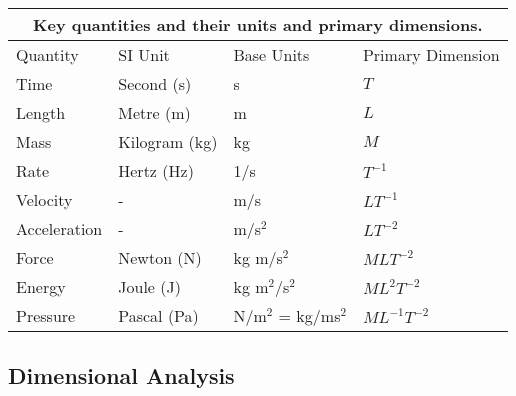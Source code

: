 \documentclass[letterpaper,12pt]{article}
\begin{document}
\begin{table}
\begin{center}
\begin{tabular}{ |p{3cm}||p{4cm}|p{4cm}|p{4cm}|  }
 \hline
 \multicolumn{4}{|c|}{Key quantities and their units and primary dimensions.} \\
 \hline
 Quantity & SI Unit & Base Units & Primary Dimension\\
 \hline
 Time   & Second (s) & s & $T$ \\
 Length & Metre (m) & m & $L$ \\
 Mass & Kilogram (kg) & kg & $M$ \\
 Rate & Hertz (Hz) & 1/s & $T^{-1}$ \\
 Velocity & - & m/s & $LT^{-1}$ \\
 Acceleration & - & m/s$^2$ & $LT^{-2}$ \\
 Force  & Newton (N) & kg m/s$^2$ & $MLT^{-2}$ \\
 Energy  & Joule (J) & kg m$^2$/s$^2$ & $ML^2T^{-2}$\\
 Pressure & Pascal (Pa) & N/m$^2$ = kg/ms$^2$ & $ML^{-1}T^{-2}$\\
 \hline

\end{tabular}
\end{center}
\end{table}

\subsection{Dimensional Analysis}\label{sec:DA}
\end{document}
